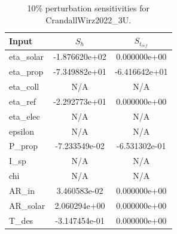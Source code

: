 \begin{table}[h]
    \centering
    \begin{tabular}{lcc}
        \toprule
        Input & $S_h$ & $S_{t_{ref}}$ \\
        \midrule
        eta\_solar & -1.876620e+02 & 0.000000e+00 \\
        eta\_prop & -7.349882e+01 & -6.416642e+01 \\
        eta\_coll & N/A & N/A \\
        eta\_ref & -2.292773e+01 & 0.000000e+00 \\
        eta\_elec & N/A & N/A \\
        epsilon & N/A & N/A \\
        P\_prop & -7.233549e-02 & -6.531302e-01 \\
        I\_sp & N/A & N/A \\
        chi & N/A & N/A \\
        AR\_in & 3.460583e-02 & 0.000000e+00 \\
        AR\_solar & 2.060294e+00 & 0.000000e+00 \\
        T\_des & -3.147454e-01 & 0.000000e+00 \\
        \bottomrule
    \end{tabular}
    \caption{10\% perturbation sensitivities for CrandallWirz2022\_3U.}
    \label{tab:sensitivity_crandallwirz2022_3u}
\end{table}
